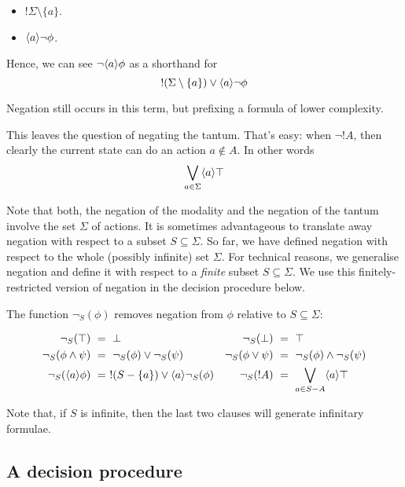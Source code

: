 \begin{itemize}

\item $!\Sigma \setminus \{a\}$.

\item $\langle a \rangle \neg \phi$.

\end{itemize}

\NI Hence, we can see $\neg \langle a \rangle \phi$ as a shorthand for 
\[
   !(\Sigma \setminus \{a\}) \lor \langle a \rangle \neg \phi
\]

\NI Negation still occurs in this term, but prefixing a formula of
lower complexity.

This leaves the question of negating the tantum. That's easy: when
$\neg !A$, then clearly the current state can do an action $a \notin
A$. In other words
\[
   \bigvee_{a \in \Sigma}\langle a \rangle \top
\]

\NI Note that both, the negation of the modality and the negation of
the tantum involve the set $\Sigma$ of actions. It is sometimes
advantageous to translate away negation with respect to a subset $S
\subseteq \Sigma$.  So far, we have defined negation with respect to
the whole (possibly infinite) set $\Sigma$. For technical reasons, we
generalise negation and define it with respect to a \emph{finite}
subset $S \subseteq \Sigma$. We use this finitely-restricted version of
negation in the decision procedure below.

\begin{definition}
The function $\neg_{S}(\phi)$ removes negation from $\phi$
relative to $S \subseteq \Sigma$:

\begin{align*}
  \neg_{S}(\top) &\ =\  \bot  &
  \neg_S(\bot) &\ =\  \top  \\
  \neg_S(\phi \land \psi) &\ =\  \neg_S(\phi) \lor \neg_S(\psi)  &
  \neg_S(\phi \lor \psi) &\ =\  \neg_S(\phi) \land \neg_S(\psi)  \\
  \neg_S(\langle a \rangle \phi) &\ =\  !(S-\{a\}) \lor \langle a \rangle \neg_S(\phi)  &
  \neg_S(! A) &\ =\  \bigvee_{a \in S - A} \langle a \rangle \top
\end{align*}


\end{definition}

\NI Note that, if $S$ is infinite, then the last two clauses will
generate infinitary formulae.

\subsection{A decision procedure}

